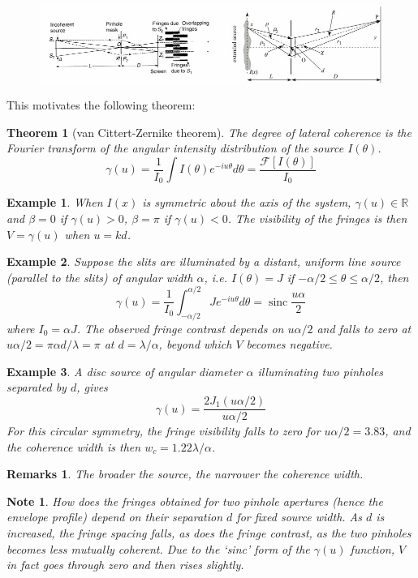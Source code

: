 \documentclass[a4paper]{article}
\DeclareMathOperator{\sinc}{sinc}
\newtheorem{remarks}{Remarks}[section]
\newtheorem{eg}{Example}[section]
\newtheorem{Note}{Note}[section]
\theoremstyle{new}
\newtheorem{thm}{Theorem}[section]
\begin{document}
\begin{figure}[H]
    \centering
    \includegraphics[width=\linewidth]{spatialcoherence.JPG}
\end{figure}
This motivates the following theorem:
\begin{thm}[van Cittert-Zernike theorem]
The degree of lateral coherence is the Fourier transform of the angular intensity distribution of the source $I(\theta)$.
$$\gamma(u)=\frac{1}{I_0}\int I(\theta)e^{-iu\theta} d\theta=\frac{\mathcal{F}[I(\theta)]}{I_0}$$
\end{thm}
\begin{eg}
When $I(x)$ is symmetric about the axis of the system, $\gamma(u)\in\mathbb{R}$ and $\beta=0$ if $\gamma(u)>0$, $\beta=\pi$ if $\gamma(u)<0$. The visibility of the fringes is then $V=\gamma(u)$ when $u=kd$.
\end{eg}
\begin{eg}
Suppose the slits are illuminated by a distant, uniform line source (parallel to the slits) of angular width $\alpha$, i.e. $I(\theta)=J$ if $-\alpha/2\leq\theta\leq\alpha/2$, then
$$\gamma(u)=\frac{1}{I_0}\int_{-\alpha/2}^{\alpha/2}Je^{-iu\theta} d\theta=\sinc\frac{u\alpha}{2}$$
where $I_0=\alpha J$. The observed fringe contrast depends on $u\alpha/2$ and falls to zero at $u\alpha/2=\pi\alpha d/\lambda=\pi$ at $d=\lambda/\alpha$, beyond which $V$ becomes negative.
\end{eg}
\begin{eg}
A disc source of angular diameter $\alpha$ illuminating two pinholes separated by $d$, gives
$$\gamma(u)=\frac{2J_1(u\alpha/2)}{u\alpha/2}$$
For this circular symmetry, the fringe visibility falls to zero for $u\alpha/2=3.83$, and the coherence width is then $w_c=1.22\lambda/\alpha$.
\end{eg}
\begin{remarks}
The broader the source, the narrower the coherence width.
\end{remarks}
\begin{Note}
How does the fringes obtained for two pinhole apertures (hence the envelope profile) depend on their separation $d$ for fixed source width. As $d$ is increased, the fringe spacing falls, as does the fringe contrast, as the two pinholes becomes less mutually coherent. Due to the `sinc' form of the $\gamma(u)$ function, $V$ in fact goes through zero and then rises slightly.
\end{Note}
\end{document}
